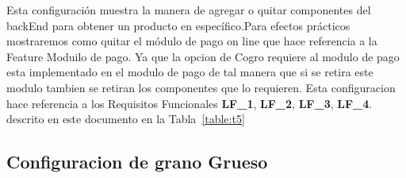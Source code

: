 \documentclass[10pt,a4paper,openany]{book}
\begin{document}
Esta configuración muestra la manera de agregar o quitar componentes del backEnd para obtener un producto en específico.Para efectos prácticos mostraremos como quitar el módulo de pago on line que hace referencia a la Feature Moduilo de pago. Ya que la opcion de Cogro requiere al modulo de pago esta implementado en el modulo de pago de tal manera que si se retira este modulo tambien se retiran los componentes que lo requieren. Esta configuracion hace referencia a los Requisitos Funcionales \textbf{LF\_1}, \textbf{LF\_2}, \textbf{LF\_3}, \textbf{LF\_4}. descrito en este documento en la Tabla~\ref{table:t5}

\subsection{Configuracion de grano Grueso}
\end{document}
